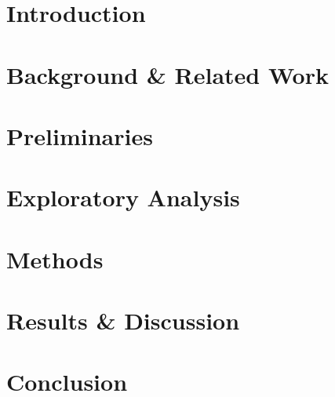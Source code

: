 \documentclass[letterpaper]{article} %
\begin{document}
\vspace{-1.5em} 
\section{Introduction}
\label{sec:intro}


\vspace{-0.5em} 
\section{Background \& Related Work}
\label{sec:related}



\vspace{-1mm}
\section{Preliminaries}
\label{sec:prelim}



\vspace{-0.5em} 
\section{Exploratory Analysis}
\label{sec:exploratory}



\vspace{-0.5em} 
\section{Methods}
\label{sec:methodology}



\vspace{-0.5em} 
\section{Results \& Discussion}
\label{sec:results-discuss}


% 


\vspace{-0.8em} 
\section{Conclusion}
\label{sec:conclusion}


\end{document}
